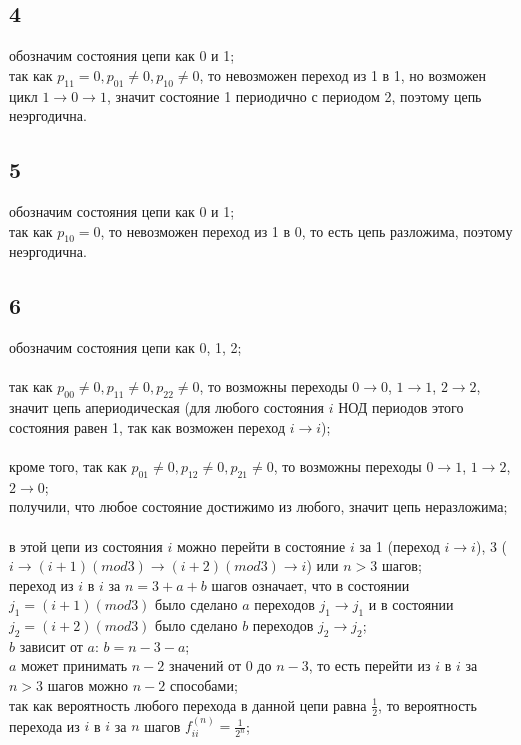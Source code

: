 \documentclass[a4paper]{article}
\begin{document}
\begin{large}
	\subsection*{4}
	обозначим состояния цепи как 0 и 1;\\
	так как $p_{11}=0,p_{01}\ne0,p_{10}\ne0$, то невозможен переход из 1 в 1, но возможен цикл $1\rightarrow0\rightarrow1$, значит состояние 1 периодично с периодом 2, поэтому цепь неэргодична.
	\subsection*{5}
	обозначим состояния цепи как 0 и 1;\\
	так как $p_{10}=0$, то невозможен переход из 1 в 0, то есть цепь разложима, поэтому неэргодична.
	\subsection*{6}
	обозначим состояния цепи как 0, 1, 2;\\\\
	так как $p_{00}\ne0,p_{11}\ne0,p_{22}\ne0$, то возможны переходы $0\rightarrow0$, $1\rightarrow1$, $2\rightarrow2$, значит цепь апериодическая (для любого состояния $i$ НОД периодов этого состояния равен 1, так как возможен переход $i\rightarrow i$);\\\\
	кроме того, так как $p_{01}\ne0,p_{12}\ne0,p_{21}\ne0$, то возможны переходы $0\rightarrow1$, $1\rightarrow2$, $2\rightarrow0$;\\
	получили, что любое состояние достижимо из любого, значит цепь неразложима;\\\\
	в этой цепи из состояния $i$ можно перейти в состояние $i$ за 1 (переход $i\rightarrow i$), 3 ($i\rightarrow (i+1)(mod 3)\rightarrow (i+2)(mod 3)\rightarrow i$) или $n>3$ шагов;\\
	переход из $i$ в $i$ за $n=3+a+b$ шагов означает, что в состоянии $j_1=(i+1)(mod 3)$ было сделано $a$ переходов $j_1\rightarrow j_1$ и в состоянии $j_2=(i+2)(mod 3)$ было сделано $b$ переходов $j_2\rightarrow j_2$;\\
	$b$ зависит от $a$: $b=n-3-a$;\\
	$a$ может принимать $n-2$ значений от 0 до $n-3$, то есть перейти из $i$ в $i$ за $n>3$ шагов можно $n-2$ способами;\\
	так как вероятность любого перехода в данной цепи равна $\frac{1}{2}$, то вероятность перехода из $i$ в $i$ за $n$ шагов $f_{ii}^{(n)}=\frac{1}{2^n}$;\\

\end{large}
\end{document}
